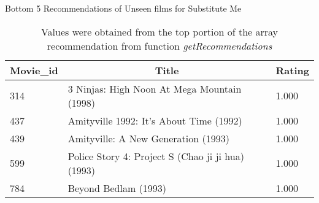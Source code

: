 \begin{table}[!htbp]
	\caption{Bottom 5 Recommendations of Unseen films for Substitute Me} \label{tab:bottom-unseen}
	\begin{center}
	\vspace{-5mm}
		\begin{tabular}{ l l l }
			\hline
			\multicolumn{1}{c}{Movie\_id} & \multicolumn{1}{c}{Title} & \multicolumn{1}{c}{Rating}\\
			\hline
			314    & 3 Ninjas: High Noon At Mega Mountain (1998)       &     1.000\\
			437    & Amityville 1992: It's About Time (1992)           &     1.000\\
			439    & Amityville: A New Generation (1993)               &     1.000\\
			599    & Police Story 4: Project S (Chao ji ji hua) (1993) &     1.000\\
			784    & Beyond Bedlam (1993)                              &     1.000\\
			\hline
		\end{tabular}
	\caption*{\scriptsize Values were obtained from the top portion of the array recommendation from function \textit{getRecommendations}}
	 \end{center}
\end{table}